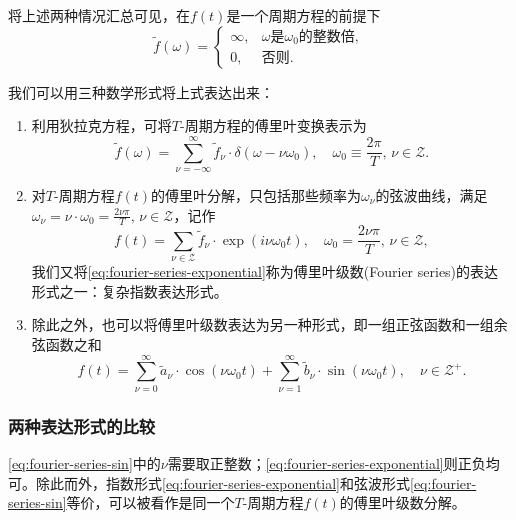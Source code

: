 将上述两种情况汇总可见，在$f(t)$是一个周期方程的前提下
\begin{equation*}
  \tilde{f}(\omega) =
  \begin{cases}
    \infty, & \omega\text{是}\omega_{0}\text{的整数倍},\\
    0, & \text{否则}.
  \end{cases}
\end{equation*}

我们可以用三种数学形式将上式表达出来：
\begin{enumerate}
  \item 利用狄拉克方程，可将$T$-周期方程的傅里叶变换表示为
  \begin{equation}
    \label{eq:fourier-series-dirac}
    \tilde{f}(\omega) = \sum_{\nu = - \infty}^{\infty}
    \tilde{f}_{\nu} \cdot \delta \left( \omega - \nu \omega_{0} \right), \quad \omega_{0} \equiv \frac{2 \pi}{T}, \, \nu \in \mathcal{Z}.
  \end{equation}
  \item 对$T$-周期方程$f(t)$的傅里叶分解，只包括那些频率为$\omega_{\nu}$的弦波曲线，满足$\omega_{\nu} = \nu \cdot \omega_{0} = \frac{2 \nu \pi}{T}, \, \nu \in \mathcal{Z}$，记作
  \begin{equation}
    \label{eq:fourier-series-exponential}
    f(t) = \sum_{\nu \in \mathcal{Z}} \tilde{f}_{\nu} \cdot \exp \left( i \nu \omega_{0} t \right), \quad \omega_{0} = \frac{2 \nu \pi}{T}, \, \nu \in \mathcal{Z},
  \end{equation}
  我们又将\eqref{eq:fourier-series-exponential}称为傅里叶级数(Fourier series)的表达形式之一：复杂指数表达形式。

  \item 除此之外，也可以将傅里叶级数表达为另一种形式，即一组正弦函数和一组余弦函数之和
  \begin{equation}
    \label{eq:fourier-series-sin}
    f(t) = \sum_{\nu = 0}^{\infty} \tilde{a}_{\nu} \cdot \cos \left( \nu \omega_{0} t \right)
    + \sum_{\nu = 1}^{\infty} \tilde{b}_{\nu} \cdot \sin \left( \nu \omega_{0} t \right), \quad \nu \in \mathcal{Z}^{+}.
  \end{equation}
\end{enumerate}

\subsubsection{两种表达形式的比较}
  \eqref{eq:fourier-series-sin}中的$\nu$需要取正整数；\eqref{eq:fourier-series-exponential}则正负均可。除此而外，指数形式\eqref{eq:fourier-series-exponential}和弦波形式\eqref{eq:fourier-series-sin}等价，可以被看作是同一个$T$-周期方程$f(t)$的傅里叶级数分解。

